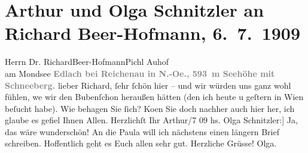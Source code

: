 

         
         \renewcommand{\erwaehntePersonen}{Personen: Richard Beer-Hofmann, Paula Beer-Hofmann, Heinrich Schnitzler}
         \renewcommand{\erwaehnteOrte}{Orte: Edlach, Hotel Pichl-Auhof, Pichl am See, Schneeberg, Wien}
         \renewcommand{\erwaehnteWerke}{}
               \section[Arthur und Olga Schnitzler an Richard Beer-Hofmann, 6. 7. 1909]{ Arthur und Olga Schnitzler an Richard Beer-Hofmann, 6. 7. 1909}\nopagebreak{}\rehead{ }\begin{ledgroupsized}[t]{13cm}\normalsize\beginnumbering \toendnotes[C]{\smallbreak\pagebreak[2]} 
\toendnotes[C]{\smallbreak}\pstart{}{\pb}Herrn Dr. Richard\pend{}\pstart{}Beer-Hofmann\pend{}\pstart{}Pichl Auhof{\\}am Mondsee\pend{}{\bigskip}\pstart
           \noindent{}\centering{}{\pb}\textcolor{gray}{\textbf{Edlach bei Reichenau in N.-Oe., 593 m
                     Seehöhe mit Schneeberg.}}\pend
           \pstart
           {\pb}lieber Richard, ſehr ſchön hier – und wir würden uns ganz wohl
               fühlen, we{\geminationn} wir den Bubenſchon heraußen hätten (den ich heute u geſtern in
                  Wien beſucht habe).\pend
           \pstart
           Wie behagen Sie ſich? Ko{\geminationm}en Sie doch nachher auch hier
               her, ich glaube es gefiel Ihnen Allen.\pend
           \pstart Herzlichſt Ihr \spacefill\mbox{Arthur}\pend{}/7 09\pend
           \pstart
           \noindent{}{[}hs. Olga Schnitzler:{]} Ja, das wäre wunderschön! An die Paula will ich nächstens einen längern Brief schreiben.
               Hoffentlich geht es Euch allen sehr gut.\pend
           \pstart Herzliche Grüsse! \spacefill\mbox{Olga.}\pend{}
         

\end{ledgroupsized}
